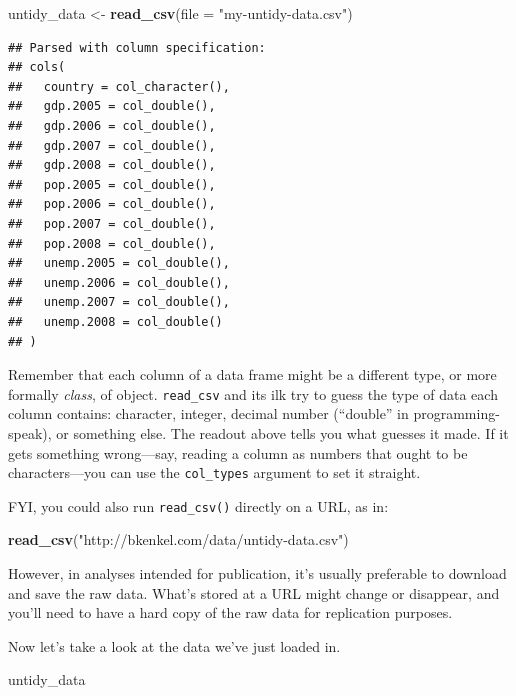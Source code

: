\documentclass[12pt,oneside,openany]{book}
\newenvironment{Shaded}{\begin{snugshade}}{\end{snugshade}}
\newcommand{\KeywordTok}[1]{\textcolor[rgb]{0.13,0.29,0.53}{\textbf{#1}}}
\newcommand{\DataTypeTok}[1]{\textcolor[rgb]{0.13,0.29,0.53}{#1}}
\newcommand{\StringTok}[1]{\textcolor[rgb]{0.31,0.60,0.02}{#1}}
\newcommand{\NormalTok}[1]{#1}
\begin{document}
\begin{Shaded}
\begin{Highlighting}[]
\NormalTok{untidy_data <-}\StringTok{ }\KeywordTok{read_csv}\NormalTok{(}\DataTypeTok{file =} \StringTok{"my-untidy-data.csv"}\NormalTok{)}
\end{Highlighting}
\end{Shaded}

\begin{verbatim}
## Parsed with column specification:
## cols(
##   country = col_character(),
##   gdp.2005 = col_double(),
##   gdp.2006 = col_double(),
##   gdp.2007 = col_double(),
##   gdp.2008 = col_double(),
##   pop.2005 = col_double(),
##   pop.2006 = col_double(),
##   pop.2007 = col_double(),
##   pop.2008 = col_double(),
##   unemp.2005 = col_double(),
##   unemp.2006 = col_double(),
##   unemp.2007 = col_double(),
##   unemp.2008 = col_double()
## )
\end{verbatim}

Remember that each column of a data frame might be a different type, or
more formally \emph{class}, of object. \texttt{read\_csv} and its ilk
try to guess the type of data each column contains: character, integer,
decimal number (``double'' in programming-speak), or something else. The
readout above tells you what guesses it made. If it gets something
wrong---say, reading a column as numbers that ought to be
characters---you can use the \texttt{col\_types} argument to set it
straight.

FYI, you could also run \texttt{read\_csv()} directly on a URL, as in:

\begin{Shaded}
\begin{Highlighting}[]
\KeywordTok{read_csv}\NormalTok{(}\StringTok{"http://bkenkel.com/data/untidy-data.csv"}\NormalTok{)}
\end{Highlighting}
\end{Shaded}

However, in analyses intended for publication, it's usually preferable
to download and save the raw data. What's stored at a URL might change
or disappear, and you'll need to have a hard copy of the raw data for
replication purposes.

Now let's take a look at the data we've just loaded in.

\begin{Shaded}
\begin{Highlighting}[]
\NormalTok{untidy_data}
\end{Highlighting}
\end{Shaded}
\end{document}
